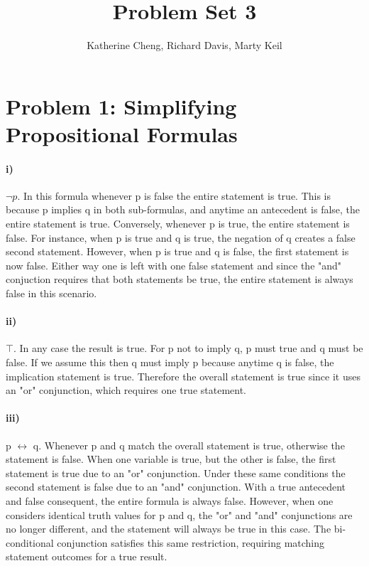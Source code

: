 \documentclass[10pt,letter]{article}
\begin{document}

\title{Problem Set 3}

\author{Katherine Cheng, Richard Davis, Marty Keil}

 
\maketitle 

\section*{Problem 1: Simplifying Propositional Formulas}
\paragraph{i)} $\neg p$. In this formula whenever p is false the entire statement is true. This is because p implies q in both sub-formulas, and anytime an antecedent is false, the entire statement is true. Conversely, whenever p is true, the entire statement is false. For instance, when p is true and q is true, the negation of q creates a false second statement. However, when p is true and q is false, the first statement is now false. Either way one is left with one false statement and since the "and" conjuction requires that both statements be true, the entire statement is always false in this scenario.

\paragraph{ii)} $\top$. In any case the result is true. For p not to imply q, p must true and q must be false. If we assume this then q must imply p because anytime q is false, the implication statement is true. Therefore the overall statement is true since it uses an "or" conjunction, which requires one true statement. 

\paragraph{iii)}  p $\leftrightarrow$ q.  Whenever p and q match the overall statement is true, otherwise the statement is false. When one variable is true, but the other is false, the first statement is true due to an "or" conjunction. Under these same conditions the second statement is false due to an "and" conjunction. With a true antecedent and false consequent, the entire formula is always false. However, when one considers identical truth values for p and q, the "or" and "and" conjunctions are no longer different, and the statement will always be true in this case. The bi-conditional conjunction satisfies this same restriction, requiring matching statement outcomes for a true result.  
\end{document}
